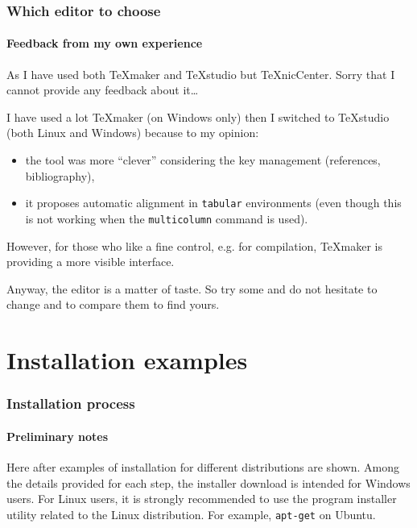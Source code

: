 \documentclass[11pt]{beamer}
\begin{document}
\begin{frame}
	\frametitle{Which editor to choose}
	\framesubtitle{Feedback from my own experience}
	
	As I have used both \TeX{}maker and \TeX{}studio but \alert{\TeX{}nicCenter}.
	Sorry that I cannot provide any feedback about it\dots
	
	I have used a lot \alert{\TeX{}maker} (on Windows only) then I switched to  \alert{\TeX{}studio} (both Linux and Windows) because to my opinion:
	\begin{itemize}
		\item the tool was more \enquote{clever} considering the key management (references, bibliography),
		\item it proposes automatic alignment in \texttt{tabular} environments (even though this is not working when the \texttt{multicolumn} command is used).
	\end{itemize}
	However, for those who like a fine control, e.g. for compilation, \TeX{}maker is providing a more visible interface.
	
	Anyway, the editor is a matter of taste. So try some and do not hesitate to change and to compare them to find yours.
\end{frame}


\section{Installation examples}

\begin{frame}
	\frametitle{Installation process}
	\framesubtitle{Preliminary notes}
	
	Here after examples of installation for different distributions are shown.
	Among the details provided for each step, the installer download is intended for Windows users.
	For Linux users, it is strongly recommended to use the program installer utility related to the Linux distribution.
	For example, \texttt{apt-get} on Ubuntu.
\end{frame}
\end{document}
